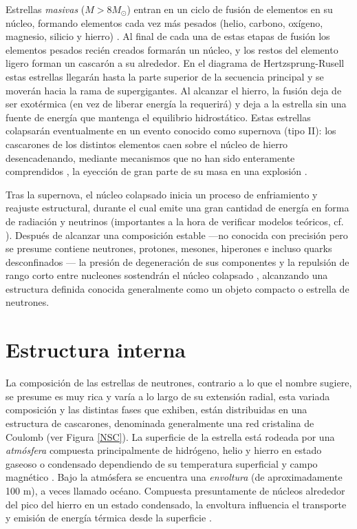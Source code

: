 Estrellas \emph{masivas} ($M>8 M_{\odot}$) entran en un ciclo de fusión de elementos en su núcleo, formando elementos cada vez más pesados (helio, carbono, oxígeno, magnesio, silicio y hierro) \cite{Glendenning2000}. Al final de cada una de estas etapas de fusión los elementos pesados recién creados formarán un núcleo, y los restos del elemento ligero forman un cascarón a su alrededor. En el diagrama de Hertzsprung-Rusell estas estrellas llegarán hasta la parte superior de la secuencia principal y se moverán hacia la rama de supergigantes. Al alcanzar el hierro, la fusión deja de ser exotérmica (en vez de liberar energía la requerirá) y deja a la estrella sin una fuente de energía que mantenga el equilibrio hidrostático. Estas estrellas colapsarán eventualmente en un evento conocido como supernova (tipo II): los cascarones de los distintos elementos caen sobre el núcleo de hierro desencadenando, mediante mecanismos que no han sido enteramente comprendidos \cite{Janka2012}, la eyección de gran parte de su masa en una explosión \cite{Woosley2005}.

Tras la supernova, el núcleo colapsado   inicia un proceso de enfriamiento y reajuste estructural, durante el cual emite una gran cantidad de energía en forma de radiación y neutrinos (importantes a la hora de verificar modelos teóricos, cf. \cite{Alvarez-Salazar2018}). Después de alcanzar una composición estable —no conocida con precisión pero se presume contiene neutrones, protones, mesones, hiperones e incluso quarks desconfinados \cite{Lattimer2004}— la presión de degeneración de sus componentes y la repulsión de rango corto entre nucleones sostendrán el núcleo colapsado \cite{Glendenning2000}, alcanzando una estructura definida conocida generalmente como un objeto compacto o estrella de neutrones.

\section{Estructura interna}
La composición de las estrellas de neutrones, contrario a lo que el nombre sugiere, se presume es muy rica y varía a lo largo de su extensión radial, esta variada composición y las distintas fases que exhiben, están distribuidas en una estructura de cascarones, denominada generalmente una red cristalina de Coulomb (ver Figura \ref{NSC}).
La superficie de la estrella está rodeada por una \emph{atmósfera} compuesta principalmente de hidrógeno, helio y hierro en estado gaseoso o condensado dependiendo de su temperatura superficial y campo magnético \cite{Zavlin2002}. %
Bajo la atmósfera se encuentra una \emph{envoltura} (de aproximadamente 100 \si{\metre}), a veces llamado océano. Compuesta presuntamente de núcleos alrededor del pico del hierro en un estado condensado, la envoltura influencia el transporte y emisión de energía térmica desde la superficie \cite{Piekarewicz2013,Potekhin2010,Lattimer2004}.


